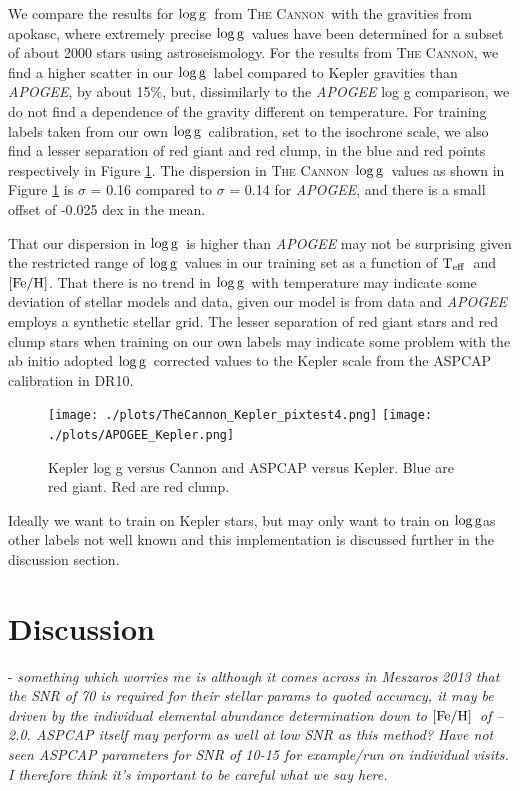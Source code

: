 \documentclass[12pt, preprint]{aastex}
\newcommand{\teff}{\mbox{$\rm T_{eff}$}}
\newcommand{\feh}{\mbox{$\rm [Fe/H]$}}
\newcommand{\logg}{\mbox{$\rm \log g$}}
\newcommand{\tc}{\textsc{The Cannon}}
\begin{document}
We compare the results for \logg\ from \tc\ with the gravities from apokasc, where extremely precise \logg\ values have been determined for a subset of about 2000 stars using astroseismology. For the results from \tc, we find a higher scatter in our \logg\ label compared to Kepler gravities than \textit{APOGEE}, by about 15\%, but, dissimilarly to the \textit{APOGEE} log g comparison, we do not find a dependence of the gravity different on temperature. For training labels taken from our own \logg\ calibration, set to the isochrone scale, we also find a lesser separation of red giant and red clump, in the blue and red points respectively in Figure \ref{fig:kepler}. The dispersion in \tc\ \logg\ values as shown in Figure \ref{fig:kepler} is $\sigma$ = 0.16 compared to $\sigma$ =  0.14 for \textit{APOGEE}, and there is a small offset of -0.025 dex in the mean. 

That our dispersion in \logg\ is higher than \textit{APOGEE} may not be surprising given the restricted range of \logg\ values in our training set as a function of \teff\ and \feh. That there is no trend in \logg\ with temperature may indicate some deviation of stellar models and data, given our model is from data and \textit{APOGEE} employs a synthetic stellar grid. The lesser separation of red giant stars and red clump stars when training on our own labels may indicate some problem with the ab initio adopted \logg\ corrected values to the Kepler scale from the ASPCAP calibration in DR10.

  \begin{figure}[h!]
 \texttt{[image: ./plots/TheCannon\_Kepler\_pixtest4.png]}
  \texttt{[image: ./plots/APOGEE\_Kepler.png]}
 \caption{Kepler log g versus Cannon and ASPCAP versus Kepler. Blue are red giant. Red are red clump.}
\label{fig:kepler}
\end{figure}


Ideally we want to train on Kepler stars, but may only want to train on \logg as other labels not well known and this implementation is discussed further in the discussion section. 


\section{Discussion}

- \textit{something which worries me is although it comes across in Meszaros 2013 that the SNR of 70 is required for their stellar params to quoted accuracy, it may be driven by the individual elemental abundance determination down to \feh\ of --2.0. ASPCAP itself may perform as well at low SNR as this method? Have not seen ASPCAP parameters for SNR of 10-15 for example/run on individual visits. I therefore think it's important to be careful what we say here.} \\
\end{document}
